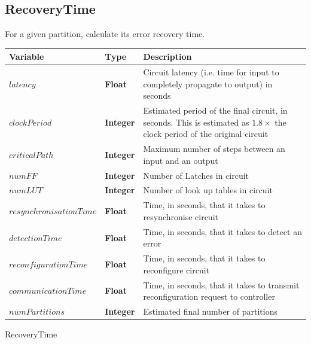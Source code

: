 \documentclass[12pt,final,oneside]{dwThesis} %
\begin{document}
   \newpage 
   \subsection{RecoveryTime}
   For a given partition, calculate its
   error recovery time.  
   \begin{algorithm}

      \begin{center}


         \begin{tabularx}
            {\linewidth}{llX} \toprule Variable & Type &
            Description\\
            \midrule $latency$ &\textbf{Float } &  Circuit
            latency (i.e. time for input to completely propagate to output) in
            seconds\\
            $clockPeriod$ &\textbf{Integer } & Estimated period of
            the final circuit, in seconds. This is estimated as $1.8\times$ the
            clock period of the original circuit\\
            $criticalPath$ &\textbf{Integer } &  Maximum number of steps between an input and an
            output\\
            $numFF$ &\textbf{Integer } &  Number of Latches in
            circuit\\
            $numLUT$ &\textbf{Integer } &  Number of look up tables
            in circuit\\
            $resynchronisationTime$ &\textbf{Float } &  Time, in
            seconds, that it takes to resynchronise circuit\\
            $detectionTime$
            &\textbf{Float } &  Time, in seconds, that it takes to detect an
            error\\
            $reconfigurationTime$ &\textbf{Float } &  Time, in
            seconds, that it takes to reconfigure circuit\\
            $communicationTime$
            &\textbf{Float } &  Time, in seconds, that it takes to transmit
            reconfiguration request to controller\\
            $numPartitions$ &\textbf{Integer } &  Estimated final number of partitions \\
            \bottomrule

         \end{tabularx}

      \end{center}
      \caption{RecoveryTime}\label{recoverytime}


\end{algorithm}
\end{document}

